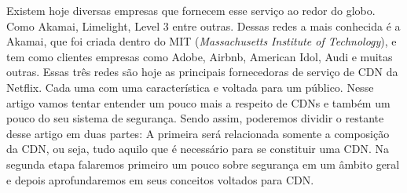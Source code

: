 \newline
Existem hoje diversas empresas que fornecem esse servi\c{c}o ao redor do globo. Como Akamai, Limelight, Level 3 entre outras. Dessas redes a mais conhecida \'e a Akamai, que foi criada dentro do MIT (\textit{Massachusetts Institute of Technology}), e tem como clientes empresas como Adobe, Airbnb, American Idol, Audi e muitas outras.
\newline
Essas tr\^es redes s\~ao hoje as principais fornecedoras de servi\c{c}o de CDN da Netflix. Cada uma com uma caracter\'istica e voltada para um p\'ublico.
\newline
Nesse artigo vamos tentar entender um pouco mais a respeito de CDNs e tamb\'em um pouco do seu sistema de seguran\c{c}a. Sendo assim, poderemos dividir o restante desse artigo em duas partes: A primeira ser\'a relacionada somente a composi\c{c}\~ao da CDN, ou seja, tudo aquilo que \'e necess\'ario para se constituir uma CDN. Na segunda etapa falaremos primeiro um pouco sobre seguran\c{c}a em um \^ambito geral e depois aprofundaremos em seus conceitos voltados para CDN.